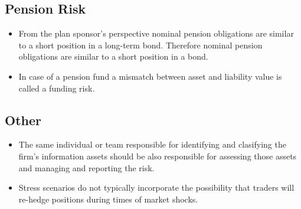 \subsection{Pension Risk}
\begin{itemize}
	\item From the plan sponsor's perspective nominal pension obligations are similar to a short position in a long-term bond. Therefore nominal pension obligations are similar to a short position in a bond.
	\item In case of a pension fund a mismatch between asset and liability value is called a funding risk.
\end{itemize}

\subsection{Other}
\begin{itemize}
	\item The same individual or team responsible for identifying and clasifying the firm's information assets should 
	be also responsible for assessing those assets and managing and reporting the risk. 
	\item Stress scenarios do not typically incorporate the possibility that traders will re-hedge positions during times of market shocks.
\end{itemize}



